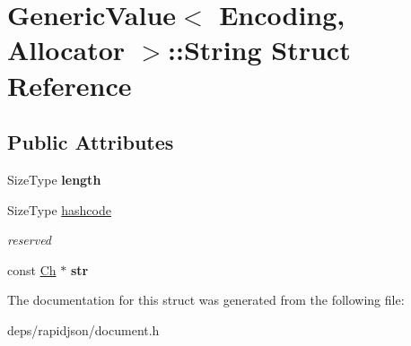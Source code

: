 \hypertarget{struct_generic_value_1_1_string}{}\section{Generic\+Value$<$ Encoding, Allocator $>$\+:\+:String Struct Reference}
\label{struct_generic_value_1_1_string}
\subsection*{Public Attributes}
\begin{DoxyCompactItemize}
\item 
Size\+Type {\bfseries length}\hypertarget{struct_generic_value_1_1_string_ad6ffab0e093aa8db6e415812ff6443bf}{}\label{struct_generic_value_1_1_string_ad6ffab0e093aa8db6e415812ff6443bf}

\item 
Size\+Type \hyperlink{struct_generic_value_1_1_string_a73631052aeb72fbabb6eaab0175f858e}{hashcode}\hypertarget{struct_generic_value_1_1_string_a73631052aeb72fbabb6eaab0175f858e}{}\label{struct_generic_value_1_1_string_a73631052aeb72fbabb6eaab0175f858e}

\begin{DoxyCompactList}\small\item\em reserved \end{DoxyCompactList}\item 
const \hyperlink{class_generic_value_ade0e0ce64ccd5d852da57a35e720bafb}{Ch} $\ast$ {\bfseries str}\hypertarget{struct_generic_value_1_1_string_a7bbed0942d66b0e4a409d73cbc988967}{}\label{struct_generic_value_1_1_string_a7bbed0942d66b0e4a409d73cbc988967}

\end{DoxyCompactItemize}


The documentation for this struct was generated from the following file\+:\begin{DoxyCompactItemize}
\item 
deps/rapidjson/document.\+h\end{DoxyCompactItemize}
